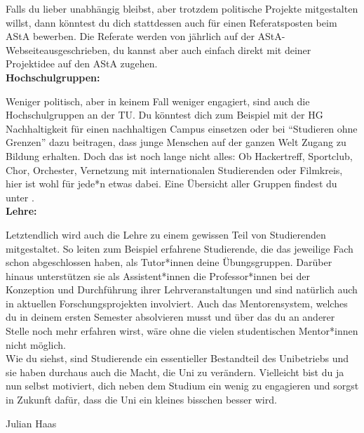 {Falls du lieber unabhängig bleibst, aber trotzdem politische Projekte mitgestalten willst, dann könntest du dich stattdessen auch für einen Referatsposten beim AStA bewerben. Die Referate werden von jährlich auf der AStA-Webseite\footnotemark[2] ausgeschrieben, du kannst aber auch einfach direkt mit deiner Projektidee auf den AStA zugehen.\\

\textbf{Hochschulgruppen:}

Weniger politisch, aber in keinem Fall weniger engagiert, sind auch die Hochschulgruppen an der TU. Du könntest dich zum Beispiel mit der HG Nachhaltigkeit für einen nachhaltigen Campus einsetzen oder bei "`Studieren ohne Grenzen"' dazu beitragen, dass junge Menschen auf der ganzen Welt Zugang zu Bildung erhalten.
Doch das ist noch lange nicht alles: Ob Hackertreff, Sportclub, Chor, Orchester, Vernetzung mit internationalen Studierenden oder Filmkreis, hier ist wohl für jede*n etwas dabei.
Eine Übersicht aller Gruppen findest du unter \footnotemark[3].\\

\textbf{Lehre:}

Letztendlich wird auch die Lehre zu einem gewissen Teil von Studierenden mitgestaltet. So leiten zum Beispiel erfahrene Studierende, die das jeweilige Fach schon abgeschlossen haben, als Tutor*innen deine Übungsgruppen. Darüber hinaus unterstützen sie als Assistent*innen die Professor*innen bei der Konzeption und Durchführung ihrer Lehrveranstaltungen und sind natürlich auch in aktuellen Forschungsprojekten involviert.
Auch das Mentorensystem, welches du in deinem ersten Semester absolvieren musst und über das du an anderer Stelle noch mehr erfahren wirst, wäre ohne die vielen studentischen Mentor*innen nicht möglich.\\

Wie du siehst, sind Studierende ein essentieller Bestandteil des Unibetriebs und sie haben durchaus auch die Macht, die Uni zu verändern. Vielleicht bist du ja nun selbst motiviert, dich neben dem Studium ein wenig zu engagieren und sorgst in Zukunft dafür, dass die Uni ein kleines bisschen besser wird.}
{Julian Haas}

